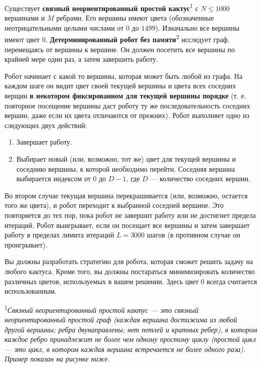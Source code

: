 \documentclass[12pt]{article}
\begin{document}
\renewcommand{\round}{Day 2}
\renewcommand{\problemName}{Task Navigation}
\renewcommand{\lang}{Russian}

\renewcommand{\tl}{$3$ sec.}
\renewcommand{\ml}{$512$ MB}
\problem{\problemName}

Существует \textbf{связный неориентированный простой кактус}\textsuperscript{1} с $N \leq 1000$ вершинами и $M$ ребрами. Его вершины имеют цвета (обозначенные неотрицательными целыми числами от $0$ до $1499$). Изначально все вершины имеют цвет $0$. \textbf{Детерминированный робот без памяти}\textsuperscript{2} исследует граф, перемещаясь от вершины к вершине. Он должен посетить все вершины по крайней мере один раз, а затем завершить работу.

Робот начинает с какой то вершины, которая может быть любой из графа. На каждом шаге он видит цвет своей текущей вершины  и цвета всех соседних верщин \textbf{в некотором фиксированном для текущей вершины порядке} (т. е. повторное посещение вершины даст роботу ту же последовательность соседних вершин, даже если их цвета отличаются от прежних). Робот выполняет одно из следующих двух действий:
\begin{enumerate}
    \item Завершает работу.
    \item Выбирает новый (или, возможно, тот же) цвет для текущей вершины и соседнию вершины, к которой необходимо перейти. Соседняя вершина выбирается индексом от $0$ до $D-1$, где $D$ — количество соседних вершин.
\end{enumerate}

Во втором случае текущая вершина перекрашивается (или, возможно, остается того же цвета), и робот переходит к выбранной соседней вершине. Это повторяется до тех пор, пока робот не завершит работу или не достигнет предела итераций. Робот выигрывает, если он посещает все вершины и затем завершает работу в пределах лимита итераций $L = 3000$ шагов (в противном случае он проигрывает).

Вы должны разработать стратегию для робота, которая сможет решить задачу на любого кактуса. Кроме того, вы должны постараться минимизировать количество различных цветов, используемых в вашем решении. Здесь цвет 0 всегда считается использованным.

\textsuperscript{1}\textit{Связный неориентированный простой кактус — это связный неориентированный простой граф (каждая вершина достижима из любой другой вершины; ребра двунаправлены; нет петлей и кратных ребер), в котором каждое ребро принадлежит не более чем одному простому циклу (простой цикл — это цикл, в котором каждая вершина встречается не более одного раза). Пример показан на рисунке ниже.}
\end{document}
